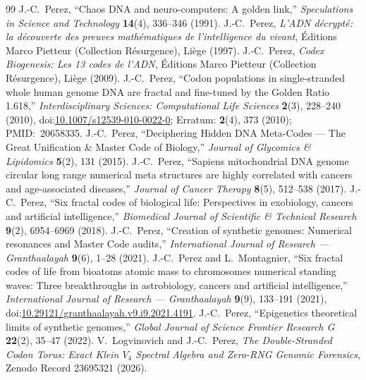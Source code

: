 \documentclass[11pt,a4paper]{article}
\renewcommand{\_}{\origunderscore\penalty200\relax}
\theoremstyle{remark}
\begin{document}
\begin{thebibliography}{99}
 J.-C.~Perez, ``Chaos DNA and neuro-computers: A golden link,'' \textit{Speculations in Science and Technology} \textbf{14}(4), 336--346 (1991).
 J.-C.~Perez, \textit{L'ADN d\'ecrypt\'e: la d\'ecouverte des preuves math\'ematiques de l'intelligence du vivant}, \'Editions Marco Pietteur (Collection R\'esurgence), Li\`ege (1997).
 J.-C.~Perez, \textit{Codex Biogenesis: Les 13 codes de l'ADN}, \'Editions Marco Pietteur (Collection R\'esurgence), Li\`ege (2009).
 J.-C.~Perez, ``Codon populations in single-stranded whole human genome DNA are fractal and fine-tuned by the Golden Ratio 1.618,'' \textit{Interdisciplinary Sciences: Computational Life Sciences} \textbf{2}(3), 228--240 (2010), doi:\href{https://doi.org/10.1007/s12539-010-0022-0}{10.1007/s12539-010-0022-0}; Erratum: \textbf{2}(4), 373 (2010); PMID:~20658335.
 J.-C.~Perez, ``Deciphering Hidden DNA Meta-Codes --- The Great Unification \& Master Code of Biology,'' \textit{Journal of Glycomics \& Lipidomics} \textbf{5}(2), 131 (2015).
 J.-C.~Perez, ``Sapiens mitochondrial DNA genome circular long range numerical meta structures are highly correlated with cancers and age-associated diseases,'' \textit{Journal of Cancer Therapy} \textbf{8}(5), 512--538 (2017).
 J.-C.~Perez, ``Six fractal codes of biological life: Perspectives in exobiology, cancers and artificial intelligence,'' \textit{Biomedical Journal of Scientific \& Technical Research} \textbf{9}(2), 6954--6969 (2018).
 J.-C.~Perez, ``Creation of synthetic genomes: Numerical resonances and Master Code audits,'' \textit{International Journal of Research --- Granthaalayah} \textbf{9}(6), 1--28 (2021).
 J.-C.~Perez and L.~Montagnier, ``Six fractal codes of life from bioatoms atomic mass to chromosomes numerical standing waves: Three breakthroughs in astrobiology, cancers and artificial intelligence,'' \textit{International Journal of Research --- Granthaalayah} \textbf{9}(9), 133--191 (2021), doi:\href{https://doi.org/10.29121/granthaalayah.v9.i9.2021.4191}{10.29121/granthaalayah.v9.i9.2021.4191}.
 J.-C.~Perez, ``Epigenetics theoretical limits of synthetic genomes,'' \textit{Global Journal of Science Frontier Research G} \textbf{22}(2), 35--47 (2022).
 V.~Logvinovich and J.-C.~Perez, \textit{The Double-Stranded Codon Torus: Exact Klein $V_4$ Spectral Algebra and Zero-RNG Genomic Forensics}, Zenodo Record 23695321 (2026).

\end{thebibliography}
\end{document}
